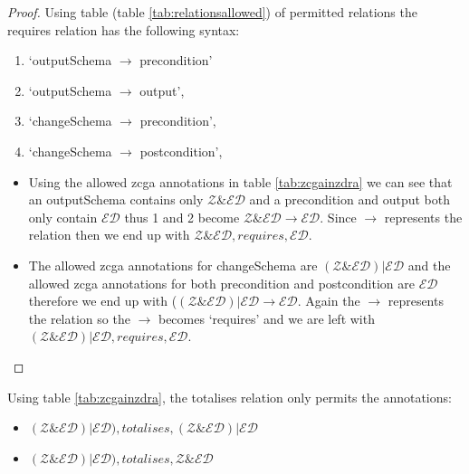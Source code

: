 \begin{proof}
Using table (table \ref{tab:relationsallowed}) of permitted relations the requires relation has the following syntax:
\begin{enumerate}
\item `outputSchema $\longrightarrow$ precondition'
\item `outputSchema $\longrightarrow$ output', 
\item `changeSchema $\longrightarrow$ precondition', 
\item `changeSchema $\longrightarrow$ postcondition', 
\end{enumerate} 
\begin{itemize}

\item Using the allowed \gls{zcga} annotations in table \ref{tab:zcgainzdra} we can see that an outputSchema contains only $\mathcal{Z} \& \mathcal{ED}$ and a precondition and output both only contain $\mathcal{ED}$ thus 1 and 2 become $\mathcal{Z} \& \mathcal{ED} \longrightarrow \mathcal{ED}$. Since $\longrightarrow$ represents the relation then we end up with $\mathcal{Z} \& \mathcal{ED}, requires, \mathcal{ED}$.

\item The allowed \gls{zcga} annotations for changeSchema are $(\mathcal{Z} \& \mathcal{ED}) | \mathcal{ED}$ and the allowed \gls{zcga} annotations for both precondition and postcondition are $\mathcal{ED}$ therefore we end up with ($(\mathcal{Z} \& \mathcal{ED}) | \mathcal{ED} \longrightarrow \mathcal{ED}$. Again the $\longrightarrow$ represents the relation so the $\longrightarrow$ becomes `requires' and we are left with $(\mathcal{Z} \& \mathcal{ED}) | \mathcal{ED}, requires, \mathcal{ED}$.
\end{itemize}
\end{proof}

\begin{thm}
Using table \ref{tab:zcgainzdra}, the totalises relation only permits the annotations:
\begin{itemize}
\item $(\mathcal{Z} \& \mathcal{ED}) | \mathcal{ED}), totalises, (\mathcal{Z} \& \mathcal{ED}) | \mathcal{ED}$
\item $(\mathcal{Z} \& \mathcal{ED}) | \mathcal{ED}), totalises, \mathcal{Z} \& \mathcal{ED}$
\end{itemize}
\end{thm}

